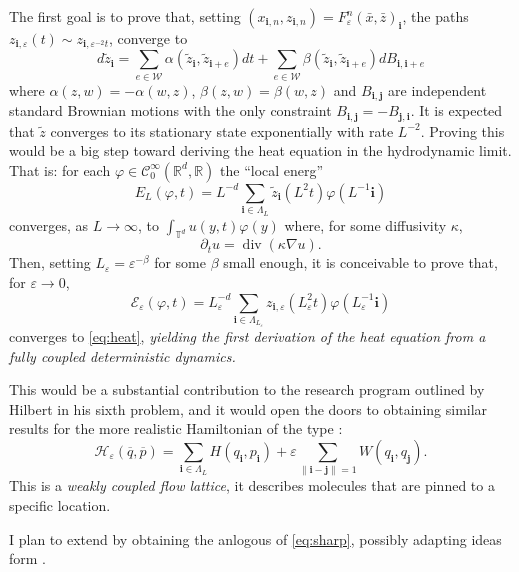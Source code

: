 \documentclass[10pt, a4paper, reqno]{amsart}
\newcommand\cC{{\mathcal C}}
\newcommand\cE{{\mathcal E}}
\newcommand\cH{{\mathcal H}}
\newcommand\cW{{\mathcal W}}
\newcommand\bR{{\mathbb R}}
\newcommand\bT{{\mathbb T}}
\newcommand\ve{\varepsilon}
\newcommand\vf{\varphi}
\newcommand\bi{{\boldsymbol i}}
\newcommand\bj{{\boldsymbol j}}
\begin{document}
The first goal is to prove that, setting $(x_{\bi,n},z_{\bi,n})=F_\ve^n(\bar x, \bar z)_\bi$, the paths
$z_{\bi,\ve}(t)\sim z_{\bi, \ve^{-2} t}$, converge to
\begin{equation}\label{eq:mesoscopic}
d\tilde z_\bi=\sum_{e\in \cW}\alpha(\tilde z_\bi,\tilde z_{\bi+e})dt+\sum_{e\in \cW}\beta(\tilde z_\bi,\tilde z_{\bi+e}) dB_{\bi,\bi+e}
\end{equation}
where $\alpha(z,w)=-\alpha(w,z)$, $\beta(z,w)=\beta(w,z)$ and $B_{\bi,\bj}$ are independent standard Brownian motions with the only constraint $B_{\bi,\bj}=-B_{\bj,\bi}$.
It is expected that $\tilde z$ converges to its stationary state exponentially with rate $L^{-2}$. Proving this would be a big step toward deriving the heat equation in the hydrodynamic limit. That is: for  each $\vf\in \cC^\infty_0(\bR^d,\bR)$ the ``local energ''
\[
E_L(\vf,t)=L^{-d}\sum_{\bi\in\Lambda_L} \tilde z_\bi(L^2 t)\vf(L^{-1}\bi)
\] 
converges, as $L\to\infty$, to $\int_{\bT^d} u(y, t)\vf(y)$ where, for some diffusivity $\kappa$,
\begin{equation}\label{eq:heat}
\partial_t u=\operatorname{div}(\kappa \nabla u).
\end{equation}
Then, setting $L_\ve=\ve^{-\beta}$ for some $\beta$ small enough, it is conceivable to prove that, for $\ve\to 0$,
\[
\cE_\ve(\vf,t)=L_\ve^{-d}\sum_{\bi\in\Lambda_{L_\ve}} z_{\bi, \ve}(L_\ve^2 t)\vf(L_\ve^{-1}\bi)
\] 
converges to \eqref{eq:heat}, {\em yielding the first derivation of the heat equation from a fully coupled deterministic dynamics.}

This would be a substantial contribution to the research program outlined by Hilbert in his sixth problem,
and it would open the doors to obtaining similar results for the more realistic Hamiltonian of the type \cite{DL11b}:
\begin{equation}\label{eq:dolgo-m}
\cH_\ve(\overline q,\overline p)=\sum_{\bi\in \Lambda_L}H(q_\bi,p_\bi)+\ve\sum_{\|\bi-\bj\|=1}W(q_\bi,q_\bj).
\end{equation}
This is a {\em weakly coupled flow lattice}, it describes molecules that are pinned to a specific location.

I plan to extend \cite{DL11b} by obtaining the anlogous of \eqref{eq:sharp}, possibly adapting ideas form \cite{Es17, TZ20}.
\end{document}
